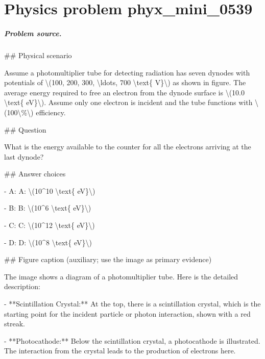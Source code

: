 
\chapter{Physics problem phyx\_mini\_0539}
\label{ch:PhyXMiniProblems_problem_phyx_mini_0539}

\paragraph{Problem source.}
\#\# Physical scenario

Assume a photomultiplier tube for detecting radiation has seven dynodes with potentials of \textbackslash{}(100, 200, 300, \textbackslash{}ldots, 700 \textbackslash{}text\{ V\}\textbackslash{}) as shown in figure. The average energy required to free an electron from the dynode surface is \textbackslash{}(10.0 \textbackslash{}text\{ eV\}\textbackslash{}). Assume only one electron is incident and the tube functions with \textbackslash{}(100\textbackslash{}\%\textbackslash{}) efficiency.

\#\# Question

What is the energy available to the counter for all the electrons arriving at the last dynode?

\#\# Answer choices

- A: A: \textbackslash{}(10\textasciicircum{}10 \textbackslash{}text\{ eV\}\textbackslash{})

- B: B: \textbackslash{}(10\textasciicircum{}6 \textbackslash{}text\{ eV\}\textbackslash{})

- C: C: \textbackslash{}(10\textasciicircum{}12 \textbackslash{}text\{ eV\}\textbackslash{})

- D: D: \textbackslash{}(10\textasciicircum{}8 \textbackslash{}text\{ eV\}\textbackslash{})

\#\# Figure caption (auxiliary; use the image as primary evidence)

The image shows a diagram of a photomultiplier tube. Here is the detailed description:

- **Scintillation Crystal:** At the top, there is a scintillation crystal, which is the starting point for the incident particle or photon interaction, shown with a red streak.
  
- **Photocathode:** Below the scintillation crystal, a photocathode is illustrated. The interaction from the crystal leads to the production of electrons here.

